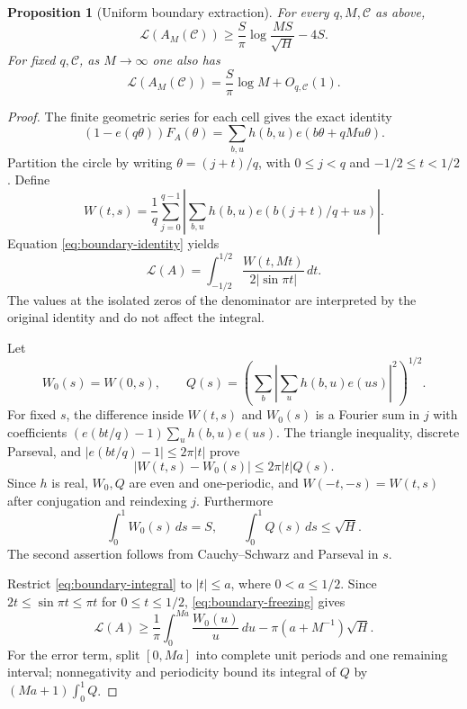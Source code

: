 \documentclass[11pt,reqno]{amsart}
\numberwithin{equation}{section}
\newtheorem{proposition}[theorem]{Proposition}
\theoremstyle{definition}
\theoremstyle{remark}
\newcommand{\La}{\mathcal L}
\begin{document}
\begin{proposition}[Uniform boundary extraction]\label{prop:boundary}
For every $q,M,\mathcal C$ as above,
\begin{equation}\label{eq:boundary-extraction}
 \La(A_M(\mathcal C))
 \ge\frac S\pi\log\frac{MS}{\sqrt H}-4S.
\end{equation}
For fixed $q,\mathcal C$, as $M\to\infty$ one also has
\begin{equation}\label{eq:boundary-asymptotic}
 \La(A_M(\mathcal C))=\frac S\pi\log M+O_{q,\mathcal C}(1).
\end{equation}
\end{proposition}
\begin{proof}
The finite geometric series for each cell gives the exact identity
\begin{equation}\label{eq:boundary-identity}
 (1-e(q\theta))F_A(\theta)
 =\sum_{b,u}h(b,u)e(b\theta+qMu\theta).
\end{equation}
Partition the circle by writing $\theta=(j+t)/q$, with
$0\le j<q$ and $-1/2\le t<1/2$. Define
\[
 W(t,s)=\frac1q\sum_{j=0}^{q-1}
       \left|\sum_{b,u}h(b,u)e(b(j+t)/q+us)\right|.
\]
Equation \eqref{eq:boundary-identity} yields
\begin{equation}\label{eq:boundary-integral}
 \La(A)=\int_{-1/2}^{1/2}
            \frac{W(t,Mt)}{2|\sin\pi t|}\,dt.
\end{equation}
The values at the isolated zeros of the denominator are interpreted
by the original identity and do not affect the integral.

Let
\[
 W_0(s)=W(0,s),\qquad
 Q(s)=\left(\sum_b\left|\sum_uh(b,u)e(us)\right|^2\right)^{1/2}.
\]
For fixed $s$, the difference inside $W(t,s)$ and $W_0(s)$ is a
Fourier sum in $j$ with coefficients
$(e(bt/q)-1)\sum_uh(b,u)e(us)$. The triangle inequality, discrete
Parseval, and $|e(bt/q)-1|\le2\pi|t|$ prove
\begin{equation}\label{eq:boundary-freezing}
 |W(t,s)-W_0(s)|\le2\pi|t|Q(s).
\end{equation}
Since $h$ is real, $W_0,Q$ are even and one-periodic, and
$W(-t,-s)=W(t,s)$ after conjugation and reindexing $j$.
Furthermore
\begin{equation}\label{eq:boundary-averages}
 \int_0^1W_0(s)\,ds=S,\qquad
 \int_0^1Q(s)\,ds\le\sqrt H.
\end{equation}
The second assertion follows from Cauchy--Schwarz and Parseval in $s$.

Restrict \eqref{eq:boundary-integral} to $|t|\le a$, where
$0<a\le1/2$. Since $2t\le\sin\pi t\le\pi t$ for $0\le t\le1/2$,
\eqref{eq:boundary-freezing} gives
\begin{equation}\label{eq:boundary-small-arc}
 \La(A)\ge\frac1\pi\int_0^{Ma}\frac{W_0(u)}u\,du
              -\pi(a+M^{-1})\sqrt H.
\end{equation}
For the error term, split $[0,Ma]$ into complete unit periods and one
remaining interval; nonnegativity and periodicity bound its integral
of $Q$ by $(Ma+1)\int_0^1Q$.


\end{proof}
\end{document}
